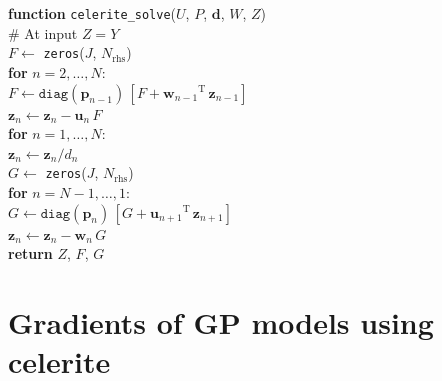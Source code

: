 \documentclass[rnaas]{aastex62}
\newcommand{\T}{\ensuremath{\mathrm{T}}}
\newcommand{\bvec}[1]{{\ensuremath{\boldsymbol{#1}}}}
\begin{document}
\medskip
\begin{minipage}{\linewidth}
\textbf{function} \texttt{celerite\_solve}($U$, $P$, $\bvec{d}$, $W$, $Z$) \\
\hspace*{2em}\textsf{\# At input $Z = Y$} \\
\hspace*{2em}$F \gets$ \texttt{zeros}($J$, $N_\mathrm{rhs}$) \\
\hspace*{2em}\textbf{for} $n = 2,\ldots,N$:\\
\hspace*{2em}\hspace*{2em}$F \gets \texttt{diag}(\bvec{p}_{n-1})\,[F +
    {\bvec{w}_{n-1}}^\T\,\bvec{z}_{n-1}]$\\
\hspace*{2em}\hspace*{2em}$\bvec{z}_n \gets \bvec{z}_n - \bvec{u}_n\,F$\\
\hspace*{2em}\textbf{for} $n = 1,\ldots,N$:\\
\hspace*{2em}\hspace*{2em}$\bvec{z}_n \gets \bvec{z}_n / d_{n}$\\
\hspace*{2em}$G \gets$ \texttt{zeros}($J$, $N_\mathrm{rhs}$) \\
\hspace*{2em}\textbf{for} $n = N-1,\ldots,1$:\\
\hspace*{2em}\hspace*{2em}$G \gets \texttt{diag}(\bvec{p}_{n})\,[G +
    {\bvec{u}_{n+1}}^\T\,\bvec{z}_{n+1}]$\\
    \hspace*{2em}\hspace*{2em}$\bvec{z}_n \gets \bvec{z}_n - \bvec{w}_n\,G$\\
\hspace*{2em}\textbf{return} $Z$, $F$, $G$
\end{minipage}
\medskip

\section{Gradients of GP models using celerite}
\end{document}
